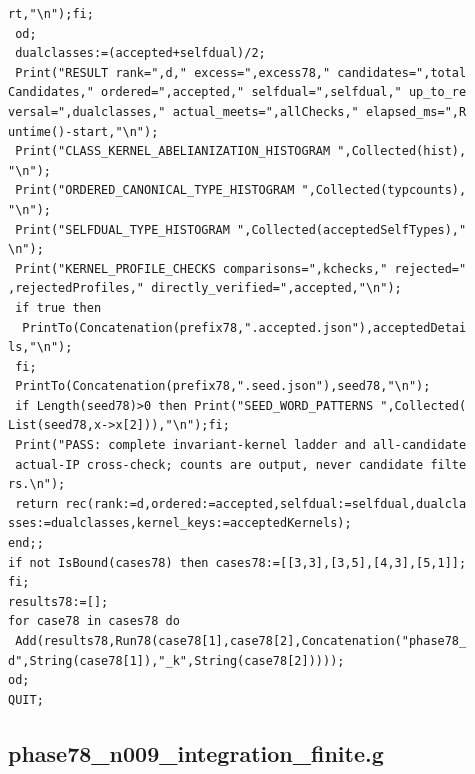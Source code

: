 \documentclass[
  11pt,
  a4paper,
]{article}
\begin{document}
\begin{verbatim}
rt,"\n");fi;
 od;
 dualclasses:=(accepted+selfdual)/2;
 Print("RESULT rank=",d," excess=",excess78," candidates=",total
Candidates," ordered=",accepted," selfdual=",selfdual," up_to_re
versal=",dualclasses," actual_meets=",allChecks," elapsed_ms=",R
untime()-start,"\n");
 Print("CLASS_KERNEL_ABELIANIZATION_HISTOGRAM ",Collected(hist),
"\n");
 Print("ORDERED_CANONICAL_TYPE_HISTOGRAM ",Collected(typcounts),
"\n");
 Print("SELFDUAL_TYPE_HISTOGRAM ",Collected(acceptedSelfTypes),"
\n");
 Print("KERNEL_PROFILE_CHECKS comparisons=",kchecks," rejected="
,rejectedProfiles," directly_verified=",accepted,"\n");
 if true then
  PrintTo(Concatenation(prefix78,".accepted.json"),acceptedDetai
ls,"\n");
 fi;
 PrintTo(Concatenation(prefix78,".seed.json"),seed78,"\n");
 if Length(seed78)>0 then Print("SEED_WORD_PATTERNS ",Collected(
List(seed78,x->x[2])),"\n");fi;
 Print("PASS: complete invariant-kernel ladder and all-candidate
 actual-IP cross-check; counts are output, never candidate filte
rs.\n");
 return rec(rank:=d,ordered:=accepted,selfdual:=selfdual,dualcla
sses:=dualclasses,kernel_keys:=acceptedKernels);
end;;
if not IsBound(cases78) then cases78:=[[3,3],[3,5],[4,3],[5,1]];
fi;
results78:=[];
for case78 in cases78 do
 Add(results78,Run78(case78[1],case78[2],Concatenation("phase78_
d",String(case78[1]),"_k",String(case78[2]))));
od;
QUIT;
\end{verbatim}

\subsection{phase78\_n009\_integration\_finite.g}\label{phase78_n009_integration_finite.g}
\end{document}
